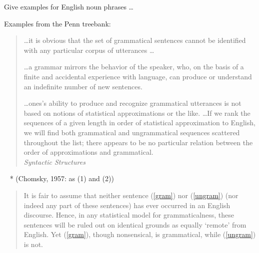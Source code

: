 \documentclass[a4paper,landscape,headrule,footrule,xetex]{foils}
\begin{document}

Give examples for English noun phrases \ldots

Examples from the Penn treebank:
\begin{exe}
  \ex {}
  \ex {}
  \ex {}
  \ex {}
  \ex {}
\ex {}
\ex {}
\end{exe}




\begin{quotation}
\ldots it is obvious that the set of grammatical
sentences cannot be identified with any particular corpus
of utterances \ldots  

\bigskip
\ldots a grammar mirrors the behavior of the speaker, who,
on the basis of a finite and accidental experience with
language, can produce or understand an indefinite
number of new sentences.   

\bigskip
\ldots  ones's ability to produce and recognize
grammatical utterances is not based on notions of
statistical approximations or the like.
\ldots  If we rank the sequences of a given length in order of
statistical approximation to English, we will find both
grammatical and ungrammatical sequences scattered
throughout the list; there appears to be no particular
relation between the order of approximations and
grammatical.  
\\ \mbox{} \hfill \citet[pp15--17]{Chomsky:1957} \textit{Syntactic Structures}  
\end{quotation}


 \begin{exe}
 \ex\label{gram} {~}
 \ex\label{ungram} *
 \hfill (Chomsky, 1957: as (1) and (2))
 \end{exe}
 \begin{quote}
   It is fair to assume that neither sentence (\ref{gram}) nor
   (\ref{ungram}) (nor indeed any part of these sentences) has ever
   occurred in an English discourse. Hence, in any statistical model
   for grammaticalness, these sentences will be ruled out on identical
   grounds as equally `remote' from English. Yet (\ref{gram}), though
   nonsensical, is grammatical, while (\ref{ungram}) is not.
 \end{quote}
\end{document}
